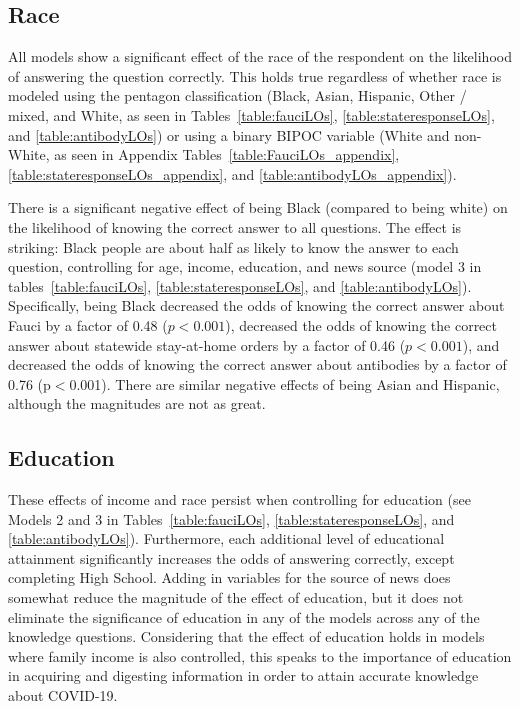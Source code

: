 \documentclass[11pt]{article}
\begin{document}
\subsection{Race}\label{sec:race}

All models show a significant effect of the race of the respondent on the likelihood of answering the question correctly. This holds true regardless of whether race is modeled using the pentagon classification (Black, Asian, Hispanic, Other / mixed, and White, as seen in Tables~\ref{table:fauciLOs}, \ref{table:stateresponseLOs}, and \ref{table:antibodyLOs}) or using a binary BIPOC variable (White and non-White, as seen in Appendix Tables~\ref{table:FauciLOs_appendix}, \ref{table:stateresponseLOs_appendix}, and \ref{table:antibodyLOs_appendix}).

There is a significant negative effect of being Black (compared to being white) on the likelihood of knowing the correct answer to all questions. The effect is striking: Black people are about half as likely to know the answer to each question, controlling for age, income, education, and news source (model 3 in tables~\ref{table:fauciLOs}, \ref{table:stateresponseLOs}, and \ref{table:antibodyLOs}). Specifically, being Black decreased the odds of knowing the correct answer about Fauci by a factor of 0.48 ($p<0.001$), %
decreased the odds of knowing the correct answer about statewide stay-at-home orders by a factor of 0.46 ($p<0.001$), %
and decreased the odds of knowing the correct answer about antibodies by a factor of 0.76 (p$<$0.001). %
There are similar negative effects of being Asian and Hispanic, although the magnitudes are not as great.

\subsection{Education}\label{sec:education}

These effects of income and race persist when controlling for education (see Models 2 and 3 in Tables~\ref{table:fauciLOs}, \ref{table:stateresponseLOs}, and \ref{table:antibodyLOs}). Furthermore, each additional level of educational attainment significantly increases the odds of answering correctly, except completing High School. Adding in variables for the source of news does somewhat reduce the magnitude of the effect of education, but it does not eliminate the significance of education in any of the models across any of the knowledge questions. Considering that the effect of education holds in models where family income is also controlled, this speaks to the importance of education in acquiring and digesting information in order to attain accurate knowledge about COVID-19.
\end{document}

